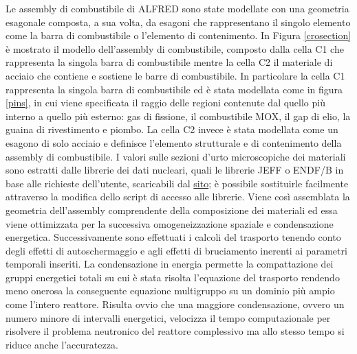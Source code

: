 Le assembly di combustibile di ALFRED sono state modellate con una geometria 
esagonale composta, a sua volta, da esagoni che rappresentano il singolo elemento 
come la barra di combustibile o l'elemento di contenimento.
In Figura \ref{crosection} è mostrato il modello dell'assembly di combustibile, 
composto dalla cella C1 che rappresenta la singola barra di combustibile mentre 
la cella C2 il materiale di acciaio che contiene e sostiene le barre di 
combustibile.
In particolare la cella C1 rappresenta la singola barra di combustibile ed è 
stata modellata come in figura \ref{pins}, in cui viene specificata il raggio 
delle regioni contenute dal quello più interno a quello più esterno: gas di 
fissione, il combustibile MOX, il gap di elio, la guaina di rivestimento e 
piombo.
La cella C2 invece è stata modellata come un esagono di solo acciaio e 
definisce 
l'elemento strutturale e di contenimento della assembly di combustibile.
I valori sulle sezioni d'urto microscopiche dei materiali sono estratti 
dalle librerie dei dati nucleari, quali le librerie JEFF o ENDF/B in base alle 
richieste dell'utente, scaricabili dal 
\href{https://www.polymtl.ca/merlin/libraries.htm}{sito};
è possibile sostituirle facilmente attraverso la modifica dello script di 
accesso alle librerie.
Viene così assemblata la geometria dell'assembly comprendente della composizione 
dei materiali 
ed essa viene ottimizzata per la successiva omogeneizzazione spaziale e 
condensazione energetica.
Successivamente sono effettuati i calcoli del trasporto tenendo conto degli 
effetti di autoschermaggio e 
agli effetti di bruciamento inerenti ai parametri temporali inseriti.
La condensazione in energia
permette la compattazione dei gruppi energetici totali su cui è stata risolta 
l'equazione del trasporto rendendo meno onerosa la conseguente equazione 
multigruppo su un dominio più ampio come l'intero reattore. 
Risulta ovvio che una maggiore condensazione, ovvero un numero minore di 
intervalli energetici, velocizza il tempo computazionale per risolvere il 
problema neutronico del reattore complessivo ma allo stesso tempo si riduce 
anche l'accuratezza.

